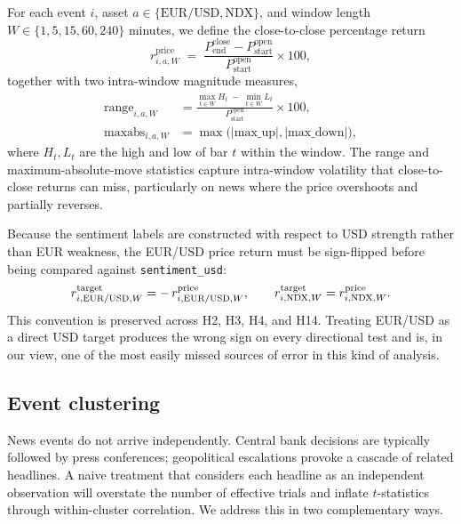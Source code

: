 For each event $i$, asset $a \in \{\text{EUR/USD}, \text{NDX}\}$,
and window length $W \in \{1, 5, 15, 60, 240\}$ minutes, we define
the close-to-close percentage return
\begin{equation}
r^{\text{price}}_{i,a,W} \;=\; \frac{P^{\text{close}}_{\text{end}} - P^{\text{open}}_{\text{start}}}{P^{\text{open}}_{\text{start}}} \times 100,
\label{eq:price-return}
\end{equation}
together with two intra-window magnitude measures,
\begin{align}
\text{range}_{i,a,W} &= \frac{\max_{t \in W} H_t \;-\; \min_{t \in W} L_t}{P^{\text{open}}_{\text{start}}} \times 100,
\label{eq:range} \\
\text{maxabs}_{i,a,W} &= \max\bigl(|\text{max\_up}|, |\text{max\_down}|\bigr),
\label{eq:maxabs}
\end{align}
where $H_t, L_t$ are the high and low of bar $t$ within the window.
The range and maximum-absolute-move statistics capture intra-window
volatility that close-to-close returns can miss, particularly on
news where the price overshoots and partially reverses.

Because the sentiment labels are constructed with respect to USD
strength rather than EUR weakness, the EUR/USD price return must be
sign-flipped before being compared against \texttt{sentiment\_usd}:
\begin{equation}
r^{\text{target}}_{i,\text{EUR/USD},W} = -\,r^{\text{price}}_{i,\text{EUR/USD},W},
\qquad
r^{\text{target}}_{i,\text{NDX},W} = r^{\text{price}}_{i,\text{NDX},W}.
\label{eq:usd-proxy}
\end{equation}
This convention is preserved across H2, H3, H4, and H14. Treating
EUR/USD as a direct USD target produces the wrong sign on every
directional test and is, in our view, one of the most easily missed
sources of error in this kind of analysis.

\subsection{Event clustering}
\label{ssec:clustering}

News events do not arrive independently. Central bank decisions are
typically followed by press conferences; geopolitical escalations
provoke a cascade of related headlines. A naive treatment that
considers each headline as an independent observation will overstate
the number of effective trials and inflate $t$-statistics through
within-cluster correlation. We address this in two complementary
ways.

